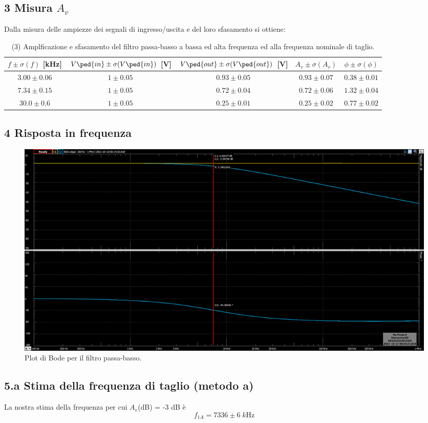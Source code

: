 \documentclass[10pt,a4paper]{article}
\begin{document}
\subsection*{3 Misura $A_v$}
Dalla misura delle ampiezze dei segnali di ingresso/uscita e del loro 
sfasamento si ottiene:
\begin{table}[h]
\centering
\begin{tabular}{|c|c|c|c|c|}
\hline 
$f \pm \sigma(f)$ [kHz] & $V\ped{in} \pm \sigma(V\ped{in})$ [V] 
                        & $V\ped{out} \pm \sigma(V\ped{out})$ [V] & $A_v \pm 
\sigma(A_v)$
& $\phi \pm \sigma(\phi)$ \\
\hline 
$3.00 \pm 0.06$ & $1 \pm 0.05$ & $0.93 \pm 0.05$ & $0.93 \pm 0.07$ & $0.38 \pm 
0.01$ \\
$7.34 \pm 0.15$ & $1 \pm 0.05$ & $0.72 \pm 0.04$ & $0.72 \pm 0.06$ & $1.32 \pm 
0.04$ \\
$30.0 \pm 0.6$ & $1 \pm 0.05$ & $0.25 \pm 0.01$ & $0.25 \pm 0.02$ & $0.77 \pm 
0.02$ \\
\hline 
\end{tabular} 
\caption{(3) Amplficazione e sfasamento del filtro passa-basso a bassa ed alta 
frequenza ed alla frequenza nominale di taglio.
\label{tab: lpfmes}}
\end{table}

\subsection*{4 Risposta in frequenza}
\begin{figure}[htbp]
\centering
\includegraphics[scale=0.35]{rc2k10nF_new}
\caption{Plot di Bode per il filtro passa-basso.}
\end{figure}

\subsection*{5.a Stima della frequenza di taglio (metodo a)}
La nostra stima della frequenza per cui $A_v$(dB) = -3 dB \`e
\[
f_{1A} = 7336 \pm 6 \; \si{k\Hz}
\]
\end{document}
